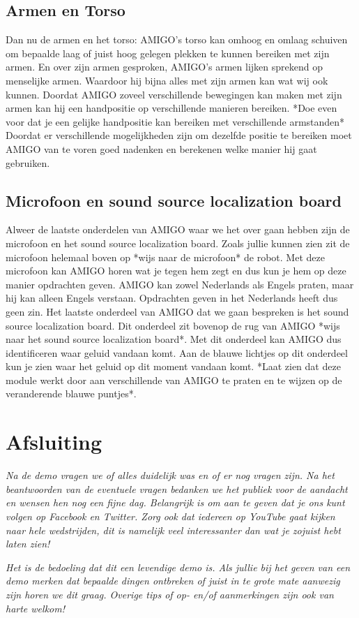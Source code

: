 \documentclass[a4paper,10pt]{article}
\numberwithin{equation}{section}
\numberwithin{figure}{section}
\numberwithin{table}{section}
\begin{document}
\subsection*{Armen en Torso}
Dan nu de armen en het torso: AMIGO's torso kan omhoog en omlaag schuiven om bepaalde laag of juist hoog gelegen plekken te kunnen bereiken met zijn armen. En over zijn armen gesproken, AMIGO's armen lijken sprekend op menselijke armen. Waardoor hij bijna alles met zijn armen kan wat wij ook kunnen. Doordat AMIGO zoveel verschillende bewegingen kan maken met zijn armen kan hij een handpositie op verschillende manieren bereiken. *Doe even voor dat je een gelijke handpositie kan bereiken met verschillende armstanden* Doordat er verschillende mogelijkheden zijn om dezelfde positie te bereiken moet AMIGO van te voren goed nadenken en berekenen welke manier hij gaat gebruiken.

\subsection*{Microfoon en sound source localization board}
Alweer de laatste onderdelen van AMIGO waar we het over gaan hebben zijn de microfoon en het sound source localization board. Zoals jullie kunnen zien zit de microfoon helemaal boven op *wijs naar de microfoon* de robot. Met deze microfoon kan AMIGO horen wat je tegen hem zegt en dus kun je hem op deze manier opdrachten geven.  AMIGO kan zowel Nederlands als Engels praten, maar hij kan alleen Engels verstaan. Opdrachten geven in het Nederlands heeft dus geen zin. Het laatste onderdeel van AMIGO dat we gaan bespreken is het sound source localization board. Dit onderdeel zit bovenop de rug van AMIGO *wijs naar het sound source localization board*. Met dit onderdeel kan AMIGO dus identificeren waar geluid vandaan komt. Aan de blauwe lichtjes op dit onderdeel kun je zien waar het geluid op dit moment vandaan komt. *Laat zien dat deze module werkt door aan verschillende van AMIGO te praten en te wijzen op de veranderende blauwe puntjes*.

\section*{Afsluiting}
\textit{Na de demo vragen we of alles duidelijk was en of er nog vragen zijn. Na het beantwoorden van de eventuele vragen bedanken we het publiek voor de aandacht en wensen hen nog een fijne dag. Belangrijk is om aan te geven dat je ons kunt volgen op Facebook en Twitter. Zorg ook dat iedereen op YouTube gaat kijken naar hele wedstrijden, dit is namelijk veel interessanter dan wat je zojuist hebt laten zien!}

\textit{Het is de bedoeling dat dit een levendige demo is. Als jullie bij het geven van een demo merken dat bepaalde dingen ontbreken of juist in te grote mate aanwezig zijn horen we dit graag. Overige tips of op- en/of aanmerkingen zijn ook van harte welkom! }
\end{document}
